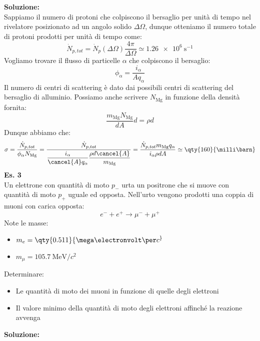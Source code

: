 \textbf{Soluzione:}\\
Sappiamo il numero di protoni che colpiscono il bersaglio per unità di tempo nel rivelatore posizionato ad un angolo solido $\Delta \Omega$, dunque otteniamo il numero totale di protoni prodotti per unità di tempo come:
\begin{equation}
  \dot{N}_{p,tot} = \dot{N}_{p}(\Delta \Omega) \dfrac{4 \pi}{\Delta \Omega} \simeq \qty{1.26e6}{\second^{-1}}
\end{equation}
Vogliamo trovare il flusso di particelle $\alpha$ che colpiscono il bersaglio:
\begin{equation}
 \phi_\alpha = \dfrac{i_\alpha}{Aq_\alpha}
\end{equation}
Il numero di centri di scattering è dato dai possibili centri di scattering del bersaglio di alluminio.
Possiamo anche scrivere $N_{\text{Mg}}$ in funzione della densità fornita:
\begin{equation}
 \dfrac{m_{\text{Mg}}N_{\text{Mg}}}{dA}d = \rho d
\end{equation}
Dunque abbiamo che:
\begin{equation}
  \sigma = \dfrac{\dot{N}_{p,tot}}{\phi_\alpha N_{\text{Mg}}} = \dfrac{\dot{N}_{p,tot}}{\dfrac{i_\alpha}{\cancel{A}q_\alpha} \dfrac{\rho d \cancel{A}}{m_{\text{Mg}}}} = \dfrac{\dot{N}_{p,tot} m_{\text{Mg}}q_\alpha}{i_\alpha \rho d A} \simeq \qty{160}{\milli\barn}
\end{equation}
\textbf{Es. 3}\\
Un elettrone con quantità di moto $p_-$ urta un positrone che si muove con quantità di moto $p_+$ uguale ed opposta. Nell'urto vengono prodotti una coppia di muoni con carica opposta:
\begin{equation}
 e^- + e^+ \rightarrow \mu^- + \mu^+
\end{equation}
Note le masse:
\begin{itemize}
 \item $m_e = \qty{0.511}{\mega\electronvolt\per c^}$
 \item $m_\mu = \qty{105.7}{\mega\electronvolt\per c^2}$
\end{itemize}
Determinare:
\begin{itemize}
  \item Le quantità di moto dei muoni in funzione di quelle degli elettroni
  \item Il valore minimo della quantità di moto degli elettroni affinché la reazione avvenga
\end{itemize}
\textbf{Soluzione:}\\
